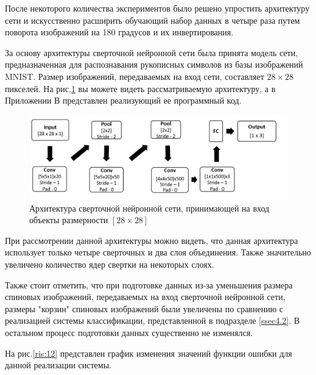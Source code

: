 \documentclass[14pt]{article}
\numberwithin{figure}{section}
\numberwithin{equation}{section}
\begin{document}
После некоторого количества экспериментов было решено упростить архитектуру сети и искусственно расширить обучающий набор данных в четыре раза путем поворота изображений на 180 градусов и их инвертирования.

За основу архитектуры сверточной нейронной сети была принята модель сети, предназначенная для распознавания рукописных символов из базы изображений MNIST. Размер изображений, передаваемых на вход сети, составляет $28 \times 28$ пикселей. На рис.\ref{ris:11} вы можете видеть рассматриваемую архитектуру, а в Приложении В представлен реализующий ее программный код.

\begin{figure}[h]
   \begin{center}
       \includegraphics[scale=0.6] {11.JPG}
       \caption{Архитектура сверточной нейронной сети, принимающей на вход объекты размерности $[28 \times 28]$}
       \label{ris:11}
   \end{center}
\end{figure}

При рассмотрении данной архитектуры можно видеть, что данная архитектура использует только четыре сверточных и два слоя объединения. Также значительно увеличено количество ядер свертки на некоторых слоях.

Также стоит отметить, что при подготовке данных из-за уменьшения размера спиновых изображений, передаваемых на вход сверточной нейронной сети, размеры "корзин" спиновых изображений были увеличены по сравнению с реализацией системы классификации, представленной в подразделе \ref{ssec4.2}. В остальном процесс подготовки данных существенно не изменялся.

На рис.\ref{ris:12} представлен график изменения значений функции ошибки для данной реализации системы.
\end{document}
